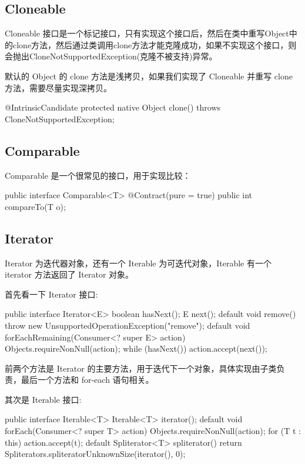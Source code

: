 \subsection{Cloneable}

Cloneable 接口是一个标记接口，只有实现这个接口后，然后在类中重写Object中的clone方法，然后通过类调用clone方法才能克隆成功，如果不实现这个接口，则会抛出CloneNotSupportedException(克隆不被支持)异常。

默认的 Object 的 clone 方法是浅拷贝，如果我们实现了 Cloneable 并重写 clone 方法，需要尽量实现深拷贝。

\begin{Java}
@IntrinsicCandidate
protected native Object clone() throws CloneNotSupportedException;
\end{Java}

\subsection{Comparable}

Comparable 是一个很常见的接口，用于实现比较：

\begin{Java}
public interface Comparable<T> {
    @Contract(pure = true)
    public int compareTo(T o);
}
\end{Java}

\subsection{Iterator}

Iterator 为迭代器对象，还有一个 Iterable 为可迭代对象，Iterable 有一个 iterator 方法返回了 Iterator 对象。

首先看一下 Iterator 接口:

\begin{Java}
public interface Iterator<E> {
    boolean hasNext();
    E next();
    default void remove() {
        throw new UnsupportedOperationException("remove");
    }
    default void forEachRemaining(Consumer<? super E> action) {
        Objects.requireNonNull(action);
        while (hasNext())
            action.accept(next());
    }
}
\end{Java}

前两个方法是 Iterator 的主要方法，用于迭代下一个对象，具体实现由子类负责，最后一个方法和 for-each 语句相关。

其次是 Iterable 接口:

\begin{Java}
public interface Iterable<T> {
    Iterable<T> iterator();
    default void forEach(Consumer<? super T> action) {
        Objects.requireNonNull(action);
        for (T t : this) {
            action.accept(t);
        }
    }
    default Spliterator<T> spliterator() {
        return Spliterators.spliteratorUnknownSize(iterator(), 0);
    }
}
\end{Java}

